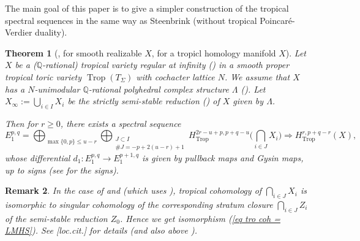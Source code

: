 \documentclass[12pt,a4]{amsart}
\newtheorem{thm}{Theorem}[section]
\newtheorem{rem}[thm]{Remark}
\def\Q{\mathbb{Q}}
\def\Trop{\mathop{\mathrm{trop}}\nolimits}
\def\Trop{\mathop{\mathrm{Trop}}\nolimits}
\numberwithin{equation}{section}
\numberwithin{figure}{section}
\begin{document}
  The main goal of this paper is 
  to give a simpler construction of 
   the tropical spectral sequences 
   in the same way as Steenbrink 
   (without tropical Poincar\'{e}-Verdier duality).

  \begin{thm}[, 
  \cite{ItenbergKatzarkovMikhalkinZharkovTropicalhomology2019}
   for smooth realizable $X$,
   \cite{AminiPiquerezHodgetheoryfortropicalvarieties2020} for a tropicl homology manifold $X$]
  \label{introduction spectral sequence for ss reduction}
   Let $X$ be a ($\Q$-rational) tropical variety regular at infinity () in a smooth proper tropical toric variety $\Trop (T_{\Sigma})$ with cochacter lattice $N$.
   We assume that $X$ has a $N$-unimodular 
    $\Q$-rational polyhedral complex structure $\Lambda$ ().
    Let $X_{\infty}:= \bigcup_{i \in I} X_i$ 
    be 
    the strictly semi-stable reduction () of $X$
    given by $\Lambda$.

    Then
    for $r \geq 0$, 
    there exists a spectral sequence 
    $$E_1^{p,q}= 
    \bigoplus_{ \max \{0,p\} \leq u -r }
    \bigoplus_{\substack{ J \subset I \\ \# J = -p + 2 (u-r) +1 } }
  H^{2r-u+p, p+q -u}_{\Trop} \big(\bigcap_{i \in J} X_i \big)
     \Rightarrow H^{r,p+q-r}_{\Trop } (X)  , $$
    whose differential $d_1 \colon E_1^{p,q} \to E_1^{p+1,q}$ is given by pullback maps and Gysin maps, up to signs (see  for the signs).
  \end{thm}

  \begin{rem}
   In the case of \cite{ItenbergKatzarkovMikhalkinZharkovTropicalhomology2019} and 
   \cite{AksnesAminiPiquerezShawCOHOMOLOGICALLYTROPICALVARIETIES2025} (which uses 
   \cite{AminiPiquerezHodgetheoryfortropicalvarieties2020}),
    tropical cohomology of $\bigcap_{i \in J} X_i $
  is isomorphic to singular cohomology of 
  the corresponding stratum closure $\bigcap_{i \in J} Z_i $ of the semi-stable reduction $Z_0$.
  Hence we get isomorphism (\ref{eq tro coh = LMHS}).
  See [loc.cit.] for details (and also above ).
  \end{rem}
\end{document}
